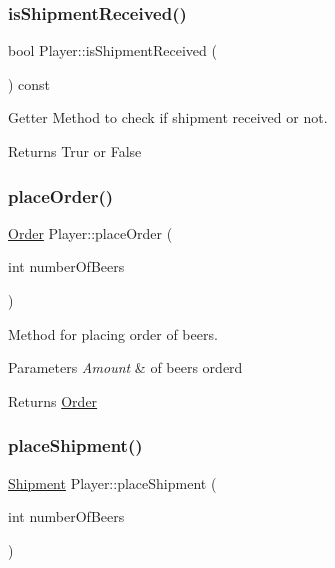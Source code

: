 \subsubsection{\texorpdfstring{is\+Shipment\+Received()}{isShipmentReceived()}}
{\footnotesize\ttfamily bool Player\+::is\+Shipment\+Received (\begin{DoxyParamCaption}{ }\end{DoxyParamCaption}) const}



Getter Method to check if shipment received or not. 

\begin{DoxyReturn}{Returns}
Trur or False 
\end{DoxyReturn}
\mbox{\label{classPlayer_a698698a4fc4ae46e2ee5085e1b132ee0}} 
\subsubsection{\texorpdfstring{place\+Order()}{placeOrder()}}
{\footnotesize\ttfamily \hyperlink{classOrder}{Order} Player\+::place\+Order (\begin{DoxyParamCaption}\item[{int}]{number\+Of\+Beers }\end{DoxyParamCaption})}



Method for placing order of beers. 


\begin{DoxyParams}{Parameters}
{\em Amount} & of beers orderd \\
\hline
\end{DoxyParams}
\begin{DoxyReturn}{Returns}
\hyperlink{classOrder}{Order} 
\end{DoxyReturn}
\mbox{\label{classPlayer_abab9379aa93644769bbd93767f9eebdc}} 
\subsubsection{\texorpdfstring{place\+Shipment()}{placeShipment()}}
{\footnotesize\ttfamily \hyperlink{classShipment}{Shipment} Player\+::place\+Shipment (\begin{DoxyParamCaption}\item[{int}]{number\+Of\+Beers }\end{DoxyParamCaption})}



